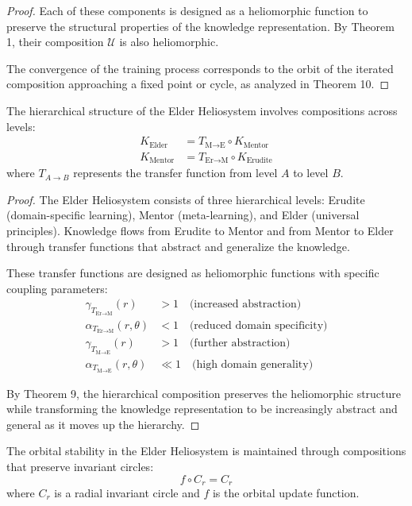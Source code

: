 \begin{definition}
\begin{enumerate}
\begin{definition}
\begin{definition}
\begin{proof}
Each of these components is designed as a heliomorphic function to preserve the structural properties of the knowledge representation. By Theorem 1, their composition $\mathcal{U}$ is also heliomorphic.

The convergence of the training process corresponds to the orbit of the iterated composition approaching a fixed point or cycle, as analyzed in Theorem 10.
\end{proof}

\begin{theorem}
The hierarchical structure of the Elder Heliosystem involves compositions across levels:
\begin{align}
K_{\text{Elder}} &= T_{\text{M}\to\text{E}} \circ K_{\text{Mentor}}\\
K_{\text{Mentor}} &= T_{\text{Er}\to\text{M}} \circ K_{\text{Erudite}}
\end{align}
where $T_{A\to B}$ represents the transfer function from level $A$ to level $B$.
\end{theorem}

\begin{proof}
The Elder Heliosystem consists of three hierarchical levels: Erudite (domain-specific learning), Mentor (meta-learning), and Elder (universal principles). Knowledge flows from Erudite to Mentor and from Mentor to Elder through transfer functions that abstract and generalize the knowledge.

These transfer functions are designed as heliomorphic functions with specific coupling parameters:
\begin{align}
\gamma_{T_{\text{Er}\to\text{M}}}(r) &> 1 \quad \text{(increased abstraction)}\\
\alpha_{T_{\text{Er}\to\text{M}}}(r,\theta) &< 1 \quad \text{(reduced domain specificity)}\\
\gamma_{T_{\text{M}\to\text{E}}}(r) &> 1 \quad \text{(further abstraction)}\\
\alpha_{T_{\text{M}\to\text{E}}}(r,\theta) &\ll 1 \quad \text{(high domain generality)}
\end{align}

By Theorem 9, the hierarchical composition preserves the heliomorphic structure while transforming the knowledge representation to be increasingly abstract and general as it moves up the hierarchy.
\end{proof}

\begin{theorem}
The orbital stability in the Elder Heliosystem is maintained through compositions that preserve invariant circles:
\begin{equation}
f \circ C_r = C_r
\end{equation}
where $C_r$ is a radial invariant circle and $f$ is the orbital update function.
\end{theorem}


\end{definition}
\end{definition}
\end{enumerate}
\end{definition}

